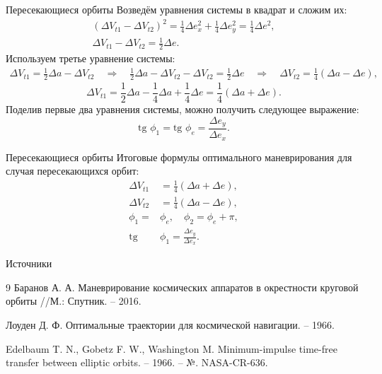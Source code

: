 \documentclass[9pt]{beamer}
\begin{document}
\begin{frame}{Пересекающиеся орбиты}
Возведём уравнения системы в квадрат и сложим их:
\begin{gather*}
    \left( \Delta V_{t1} - \Delta V_{t2} \right)^2 = \frac{1}{4} \Delta e_x^2 + \frac{1}{4} \Delta e_y^2 = \frac{1}{4} \Delta e^2, \\
    \Delta V_{t1} - \Delta V_{t2} = \frac{1}{2} \Delta e.
\end{gather*}
Используем третье уравнение системы:
\begin{gather*}
    \Delta V_{t1} = \frac{1}{2} \Delta a - \Delta V_{t2} \quad \Rightarrow \quad \frac{1}{2} \Delta a - \Delta V_{t2} - \Delta V_{t2} = \frac{1}{2} \Delta e \quad \Rightarrow \quad \Delta V_{t2} = \frac{1}{4} (\Delta a - \Delta e),
\end{gather*}
\begin{equation*}
    \Delta V_{t1} = \frac{1}{2} \Delta a - \frac{1}{4} \Delta a + \frac{1}{4} \Delta e = \frac{1}{4} (\Delta a + \Delta e).
\end{equation*}
Поделив первые два уравнения системы, можно получить следующее выражение:
\begin{equation*}
    \text{tg }  \phi_1 = \text{tg }  \phi_e = \frac{\Delta e_y}{\Delta e_x}.
\end{equation*}
\end{frame}

\begin{frame}{Пересекающиеся орбиты}
Итоговые формулы оптимального маневрирования для случая пересекающихся орбит:
\begin{equation*}
\boxed{
    \begin{aligned}
         \Delta V_{t1} &= \frac{1}{4} (\Delta a + \Delta e), \\
         \Delta V_{t2} &= \frac{1}{4} (\Delta a - \Delta e), \\
         \phi_1 = &\phi_e, \quad \phi_2 = \phi_e + \pi, \\
         \text{tg }  &\phi_1 = \frac{\Delta e_y}{\Delta e_x}.
    \end{aligned}
}
\end{equation*}
\end{frame}

\begin{frame}[allowframebreaks]{Источники}
  \begin{thebibliography}{9}
    Баранов А. А. Маневрирование космических аппаратов в окрестности круговой орбиты //М.: Спутник. – 2016.

    Лоуден Д. Ф. Оптимальные траектории для космической навигации. – 1966.
  
    Edelbaum T. N., Gobetz F. W., Washington M. Minimum-impulse time-free transfer between elliptic orbits. – 1966. – №. NASA-CR-636.
    
  \end{thebibliography}
\end{frame}
\end{document}
